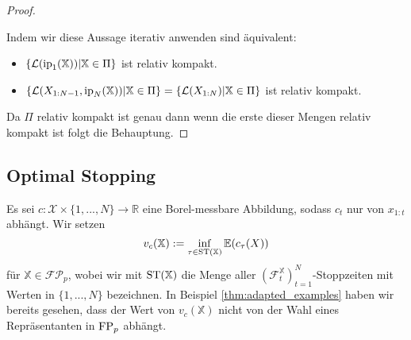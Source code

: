 \begin{proof}
\begin{itemize}
    \end{itemize}
    Indem wir diese Aussage iterativ anwenden sind äquivalent:
    \begin{itemize}
        \item $\left\{\mathcal{L}(\operatorname{ip}_1(\mathbb{X})) \vert \mathbb{X} \in \Pi\right\}$ ist relativ kompakt.
        \item $\left\{ \mathcal{L}(X_{1:N-1}, \operatorname{ip}_N(\mathbb{X})) \vert \mathbb{X} \in \Pi \right\} = \left\{ \mathcal{L}(X_{1:N}) \vert \mathbb{X} \in \Pi \right\}$ ist relativ kompakt.
    \end{itemize}
    Da $\Pi$ relativ kompakt ist genau dann wenn die erste dieser Mengen relativ kompakt ist folgt die Behauptung.
\end{proof}

\subsection{Optimal Stopping}
Es sei $c: \mathcal{X} \times \{1,...,N\} \rightarrow \mathbb{R}$ eine Borel-messbare Abbildung, sodass $c_t$ nur von $x_{1:t}$ abhängt. Wir setzen
\begin{equation}
    v_c(\mathbb{X}) := \inf\limits_{\tau \in \operatorname{ST}(\mathbb{X})} \mathbb{E}(c_\tau(X))
\end{equation}
für $\mathbb{X} \in \mathcal{FP}_p$, wobei wir mit $\operatorname{ST}(\mathbb{X})$ die Menge aller $\left(\mathcal{F}_t^\mathbb{X}\right)_{t=1}^N$-Stoppzeiten mit Werten in $\{1,...,N\}$ bezeichnen. In Beispiel \ref{thm:adapted_examples} haben wir bereits gesehen, dass der Wert von $v_c(\mathbb{X})$ nicht von der Wahl eines Repräsentanten in $\operatorname{FP}_p$ abhängt.

